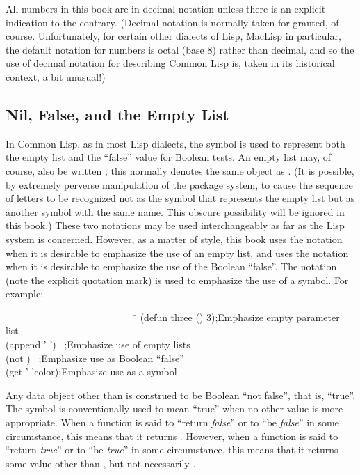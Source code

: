 All numbers in this book are in decimal notation unless
there is an explicit indication to the contrary.
(Decimal notation is normally taken for granted, of course.
Unfortunately, for certain other dialects of Lisp, MacLisp in particular,
the default notation for numbers is octal (base 8) rather than decimal,
and so the use of decimal notation for describing Common Lisp is,
taken in its historical context, a bit unusual!)

\subsection{Nil, False, and the Empty List}

In Common Lisp, as in most Lisp dialects, the symbol 
 is used to represent both the empty list and the ``false'' value
for Boolean tests.  An empty list may, of course, also be written
\cd{()}; this normally denotes the same object as .
(It is possible, by extremely perverse manipulation of the package system,
to cause the sequence of letters  to be recognized
not as the symbol that represents the empty list but as another
symbol with the same name.  This obscure possibility will be ignored
in this book.)
These two notations may be used interchangeably as far as the Lisp
system is concerned.  However, as a matter of style,
this book
uses the notation {\emptylist} when it is desirable to emphasize
the use of an empty list, and uses the notation {\false}
when it is desirable to emphasize the use of the Boolean ``false''.
The notation  (note the explicit quotation mark) is used to emphasize
the use of a symbol.
For example:
\begin{lisp}
~~~~~~~~~~~~~~~~~~~~~~~~~~~\=\kill
(defun three () 3)\>;\textrm{Emphasize empty parameter list} \\
(append '{\emptylist} '{\emptylist}) \EV\ {\emptylist}\>;\textrm{Emphasize use of empty lists} \\
(not {\false}) \EV\ {\true}\>;\textrm{Emphasize use as Boolean ``false''} \\
(get '{\nil} 'color)\>;\textrm{Emphasize use as a symbol}
\end{lisp}

Any data object other than {\false} is construed to be Boolean
``not false'', that is, ``true''.  The symbol {\true} is conventionally
used to mean ``true'' when no other value is more appropriate.
When a function is said to ``return \emph{false}'' or to ``be \emph{false}''
in some circumstance, this means that it returns {\false}.
However, when a function is said to ``return \emph{true}'' or to ``be \emph{true}''
in some circumstance, this means that it returns some value other
than {\false}, but not necessarily {\true}.

